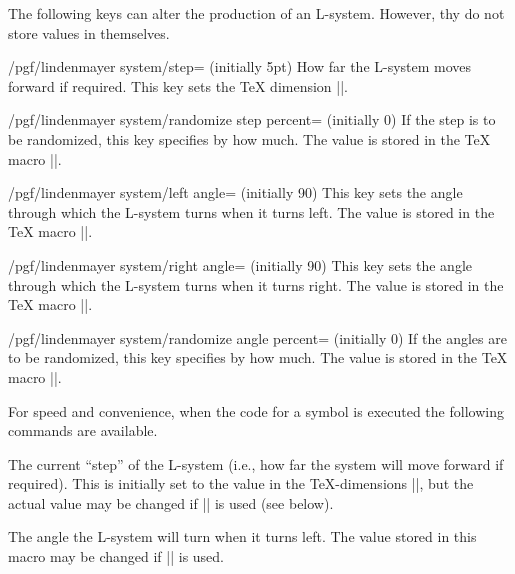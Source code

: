 \begin{command}{\pgfdeclarelindenmayersystem{}}
\begin{command}{\symbol{}}
The following keys can alter the production of an L-system. However,
thy do not store values in themselves. 

\begin{key}{/pgf/lindenmayer system/step= (initially 5pt)}
  How far the L-system moves forward if required. This key sets the
  \TeX{} dimension |\pgflsystemstep|.
\end{key}

\begin{key}{/pgf/lindenmayer system/randomize step percent= (initially 0)}
  If the step is to be randomized, this key specifies by how much.
  The value is stored in the \TeX{} macro |\pgflsystemrandomizesteppercent|.
\end{key}

\begin{key}{/pgf/lindenmayer system/left angle= (initially 90)}
  This key sets the angle through which the L-system turns when it
  turns left.
  The value is stored in the \TeX{} macro |\pgflsystemrleftangle|.
\end{key}

\begin{key}{/pgf/lindenmayer system/right angle= (initially 90)}
  This key sets the angle through which the L-system turns when it
  turns right.
  The value is stored in the \TeX{} macro |\pgflsystemrrightangle|.
\end{key}

\begin{key}{/pgf/lindenmayer system/randomize angle percent= (initially 0)}
  If the angles are to be randomized, this key specifies by how much. 
  The value is stored in the \TeX{} macro |\pgflsystemrandomizeanglepercent|.
\end{key}

For speed and convenience, when the code for a symbol is executed the 
following commands are available.

\begin{command}{\pgflsystemcurrentstep}
	The current ``step'' of the L-system (i.e., how far the system
	will move forward if required). This is initially set to the
	value in the \TeX-dimensions |\pgflsystemstep|, but the actual 
	value may be changed if |\pgflsystemrandomizestep| is used 
	(see below). 
\end{command}

\begin{command}{\pgflsystemcurrentleftangle}
	The angle the L-system will turn when it turns left. 
	The value stored in this macro may be changed if 
	|\pgflsystemrandomizeleftangle| is used. 
\end{command}


\end{command}
\end{command}
